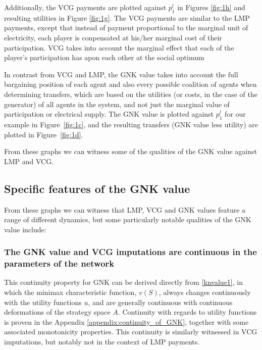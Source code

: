 Additionally, the VCG payments are plotted against $p_1^l$ in Figures \ref{fig:1h} and resulting utilities in Figure \ref{fig:1g}.
The VCG payments are similar to the LMP payments, except that instead of payment proportional to the marginal unit of electricity, each player is conpensated at his/her marginal cost of their participation.
VCG takes into account the marginal effect that each of the player's participation has apon each other at the social optimum

In contrast from VCG and LMP, the GNK value takes into account the full bargaining position of each agent and also every possible coalition of agents when determining transfers, which are based on the utilities (or costs, in the case of the generator) of all agents in the system, and not just the marginal value of participation or electrical supply.
The GNK value is plotted against $p_1^l$ for our example in Figure~\ref{fig:1c}, and the resulting transfers (GNK value less utility) are plotted in Figure~\ref{fig:1d}.

From these graphs we can witness some of the qualities of the GNK value against LMP and VCG.

\subsection{Specific features of the GNK value}

From these graphs we can witness that LMP, VCG and GNK values feature a range of different dynamics,
but some particularly notable qualities of the GNK value include:


\subsubsection*{The GNK value and VCG imputations are continuous in the parameters of the network}
This continuity property for GNK can be derived directly from \eqref{knvalue1}, in which the minimax characteristic function, $v(S)$,
always changes continuously with the utility functions $u$, and are generally continuous with continuous deformations of the strategy space $A$.
Continuity with regards to utility functions is proven in the Appendix \ref{appendix:continuity_of_GNK}, together with some associated monotonicity properties.
This continuity is similarly witnessed in VCG imputations, but notably not in the context of LMP payments.

